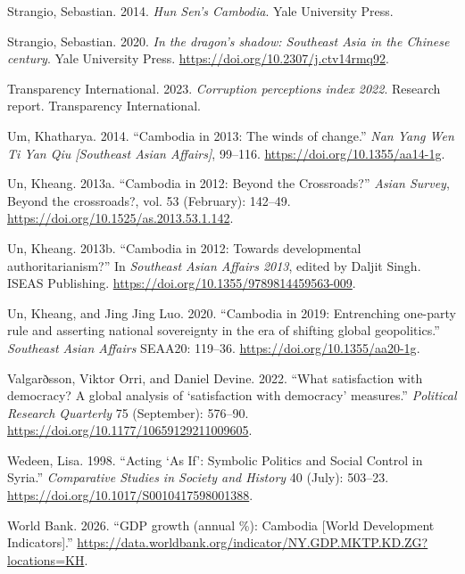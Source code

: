 \documentclass[Review,times,sageh,doublespace]{sagej}
\newlength{\cslhangindent}
\newenvironment{CSLReferences}[2] %
 {\begin{list}{}{%
  \setlength{\itemindent}{0pt}
  \setlength{\leftmargin}{0pt}
  \setlength{\parsep}{0pt}
  \ifodd #1
   \setlength{\leftmargin}{\cslhangindent}
   \setlength{\itemindent}{-1\cslhangindent}
  \fi
  \setlength{\itemsep}{#2\baselineskip}}}
 {\end{list}}
\begin{document}
\begin{CSLReferences}{1}{1}
Strangio, Sebastian. 2014. \emph{{Hun Sen's Cambodia}}. Yale University
Press.

Strangio, Sebastian. 2020. \emph{{In the dragon's shadow: Southeast Asia
in the Chinese century}}. Yale University Press.
\url{https://doi.org/10.2307/j.ctv14rmq92}.

Transparency International. 2023. \emph{{Corruption perceptions index
{2022}}}. Research report. Transparency International.

Um, Khatharya. 2014. {``{Cambodia in 2013: The winds of change}.''}
\emph{Nan Yang Wen Ti Yan Qiu {[}Southeast Asian Affairs{]}}, 99--116.
\url{https://doi.org/10.1355/aa14-1g}.

Un, Kheang. 2013a. {``{Cambodia in 2012: Beyond the Crossroads?}''}
\emph{Asian Survey}, Beyond the crossroads?, vol. 53 (February):
142--49. \url{https://doi.org/10.1525/as.2013.53.1.142}.

Un, Kheang. 2013b. {``{{Cambodia in 2012}: Towards developmental
authoritarianism?}''} In \emph{{Southeast Asian Affairs 2013}}, edited
by Daljit Singh. ISEAS Publishing.
\url{https://doi.org/10.1355/9789814459563-009}.

Un, Kheang, and Jing Jing Luo. 2020. {``{Cambodia in 2019: Entrenching
one-party rule and asserting national sovereignty in the era of shifting
global geopolitics}.''} \emph{Southeast Asian Affairs} SEAA20: 119--36.
\url{https://doi.org/10.1355/aa20-1g}.

Valgarðsson, Viktor Orri, and Daniel Devine. 2022. {``{What satisfaction
with democracy? A global analysis of {`satisfaction with democracy'}
measures}.''} \emph{Political Research Quarterly} 75 (September):
576--90. \url{https://doi.org/10.1177/10659129211009605}.

Wedeen, Lisa. 1998. {``{Acting {`As If'}: Symbolic Politics and Social
Control in Syria}.''} \emph{Comparative Studies in Society and History}
40 (July): 503--23. \url{https://doi.org/10.1017/S0010417598001388}.

World Bank. 2026. {``{GDP growth (annual \%): Cambodia {[}World
Development Indicators{]}}.''}
\url{https://data.worldbank.org/indicator/NY.GDP.MKTP.KD.ZG?locations=KH}.

\end{CSLReferences}
\end{document}
